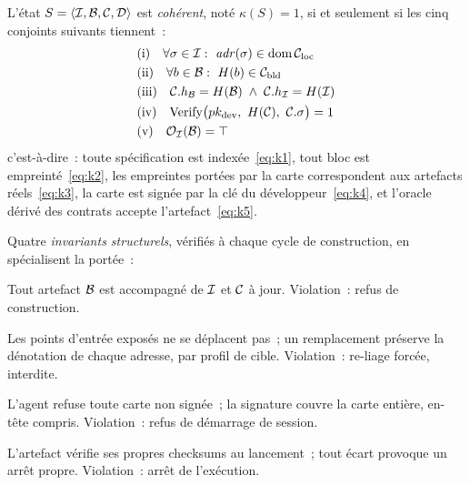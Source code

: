 \begin{defn}\label{def:kappa}
L’état $S = \langle \mathcal{I}, \mathcal{B}, \mathcal{C}, \mathcal{D} \rangle$ est \emph{cohérent}, noté
$\kappa(S) = 1$, si et seulement si les cinq conjoints suivants
tiennent~:
\begin{align}
&\text{(i)}\quad \forall \sigma \in \mathcal{I} :\ \mathit{adr}(\sigma) \in
\mathrm{dom}\,\mathcal{C}_{\mathrm{loc}}
\label{eq:k1}\\
&\text{(ii)}\quad \forall b \in \mathcal{B} :\ H(b) \in \mathcal{C}_{\mathrm{bld}}
\label{eq:k2}\\
&\text{(iii)}\quad \mathcal{C}.h_{\mathcal{B}} = H(\mathcal{B}) \;\wedge\;
\mathcal{C}.h_{\mathcal{I}} = H(\mathcal{I})
\label{eq:k3}\\
&\text{(iv)}\quad \mathrm{Verify}\bigl(pk_{\mathrm{dev}},\ H(\mathcal{C}),\
\mathcal{C}.\sigma\bigr) = 1
\label{eq:k4}\\
&\text{(v)}\quad \mathcal{O}_{\mathcal{I}}(\mathcal{B}) = \top
\label{eq:k5}
\end{align}
c’est-à-dire~: toute spécification est indexée~\eqref{eq:k1}, tout bloc est
empreinté~\eqref{eq:k2}, les empreintes portées par la carte correspondent
aux artefacts réels~\eqref{eq:k3}, la carte est signée par la clé du
développeur~\eqref{eq:k4}, et l’oracle dérivé des contrats accepte
l’artefact~\eqref{eq:k5}.
\end{defn}

Quatre \emph{invariants structurels}, vérifiés à chaque cycle de
construction, en spécialisent la portée~:

\begin{invariant}\label{inv:r1}
Tout artefact $\mathcal{B}$ est accompagné de $\mathcal{I}$ et $\mathcal{C}$ à jour. Violation~:
refus de construction.
\end{invariant}

\begin{invariant}\label{inv:r7}
Les points d’entrée exposés ne se déplacent pas~; un remplacement préserve
la dénotation de chaque adresse, par profil de cible. Violation~:
re-liage forcée, interdite.
\end{invariant}

\begin{invariant}\label{inv:r9}
L’agent refuse toute carte non signée~; la signature couvre la carte
entière, en-tête compris. Violation~: refus de démarrage de session.
\end{invariant}

\begin{invariant}\label{inv:r10}
L’artefact vérifie ses propres checksums au lancement~; tout écart
provoque un arrêt propre. Violation~: arrêt de l’exécution.
\end{invariant}

